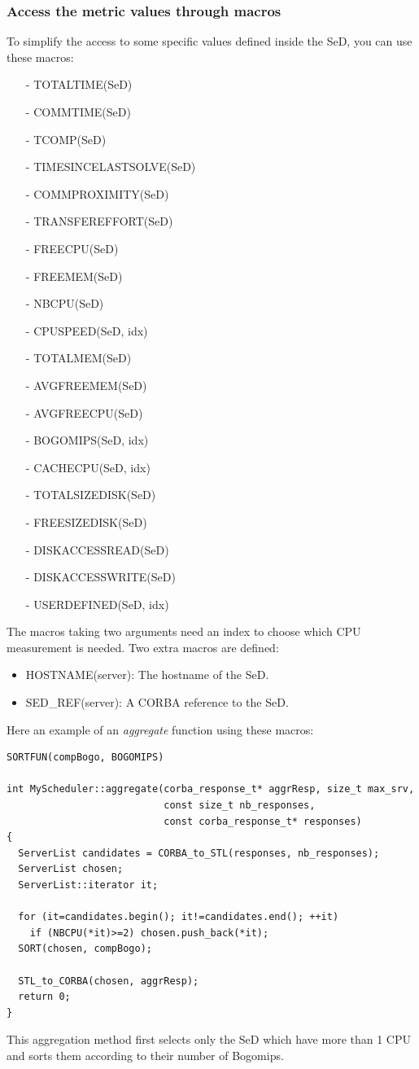 \subsubsection{Access the metric values through macros}
\label{sec:metricMacros}
To simplify the access to some specific values defined inside the SeD, you can
use these macros:
\begin{itemize}
  \item[-] TOTALTIME(SeD)
  \item[-] COMMTIME(SeD)
  \item[-] TCOMP(SeD)
  \item[-] TIMESINCELASTSOLVE(SeD)
  \item[-] COMMPROXIMITY(SeD)
  \item[-] TRANSFEREFFORT(SeD)
  \item[-] FREECPU(SeD)
  \item[-] FREEMEM(SeD)
  \item[-] NBCPU(SeD)
  \item[-] CPUSPEED(SeD, idx)
  \item[-] TOTALMEM(SeD)
  \item[-] AVGFREEMEM(SeD)
  \item[-] AVGFREECPU(SeD)
  \item[-] BOGOMIPS(SeD, idx)
  \item[-] CACHECPU(SeD, idx)
  \item[-] TOTALSIZEDISK(SeD)
  \item[-] FREESIZEDISK(SeD)
  \item[-] DISKACCESSREAD(SeD)
  \item[-] DISKACCESSWRITE(SeD)
  \item[-] USERDEFINED(SeD, idx)
\end{itemize}
The macros taking two arguments need an index to choose which CPU measurement
is needed. Two extra macros are defined:
\begin{itemize}
  \item HOSTNAME(server): The hostname of the SeD.
  \item SED\_REF(server): A CORBA reference to the SeD.
\end{itemize}

Here an example of an \textit{aggregate} function using these macros:
\begin{verbatim}
SORTFUN(compBogo, BOGOMIPS)

int MyScheduler::aggregate(corba_response_t* aggrResp, size_t max_srv,
                           const size_t nb_responses,
                           const corba_response_t* responses)
{
  ServerList candidates = CORBA_to_STL(responses, nb_responses);
  ServerList chosen;
  ServerList::iterator it;

  for (it=candidates.begin(); it!=candidates.end(); ++it)
    if (NBCPU(*it)>=2) chosen.push_back(*it);
  SORT(chosen, compBogo);

  STL_to_CORBA(chosen, aggrResp);
  return 0;
}
\end{verbatim}
This aggregation method first selects only the SeD which have more than 1 CPU
and sorts them according to their number of Bogomips.

